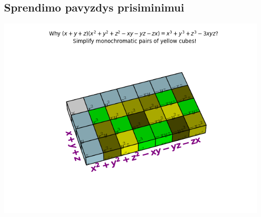 \documentclass{article}
\begin{document}
\hspace{\fill}
\begin{minipage}[b]{0.5\linewidth}
\subsection*{Sprendimo pavyzdys prisiminimui}
\includegraphics[width=\textwidth]{recipe}
 \end{minipage}
\end{document}
